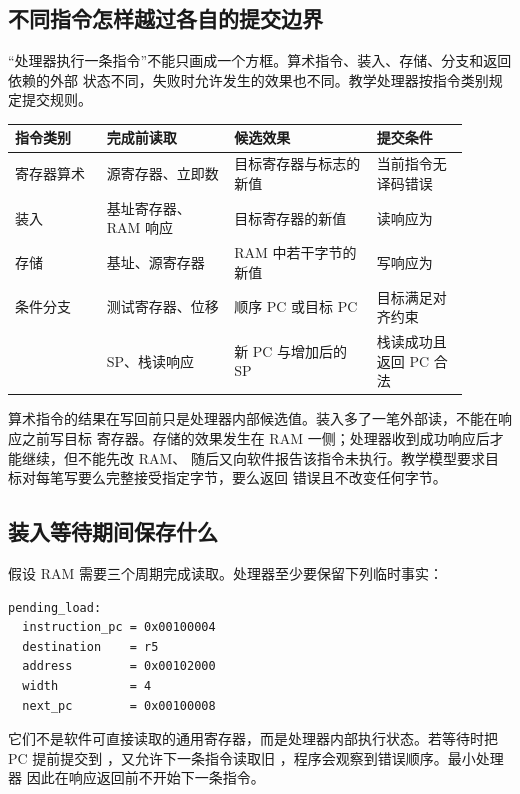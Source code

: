 \subsection{不同指令怎样越过各自的提交边界}

“处理器执行一条指令”不能只画成一个方框。算术指令、装入、存储、分支和返回依赖的外部
状态不同，失败时允许发生的效果也不同。教学处理器按指令类别规定提交规则。

\begin{longtable}{|L{0.18\linewidth}|L{0.25\linewidth}|L{0.29\linewidth}|L{0.18\linewidth}|}
\hline
{}
指令类别 & 完成前读取 & 候选效果 & 提交条件 \\ \hline
寄存器算术 & 源寄存器、立即数 & 目标寄存器与标志的新值 & 当前指令无译码错误 \\ \hline
装入 & 基址寄存器、RAM 响应 & 目标寄存器的新值 & 读响应为  \\ \hline
存储 & 基址、源寄存器 & RAM 中若干字节的新值 & 写响应为  \\ \hline
条件分支 & 测试寄存器、位移 & 顺序 PC 或目标 PC & 目标满足对齐约束 \\ \hline
{} & SP、栈读响应 & 新 PC 与增加后的 SP & 栈读成功且返回 PC 合法 \\ \hline
\end{longtable}

算术指令的结果在写回前只是处理器内部候选值。装入多了一笔外部读，不能在响应之前写目标
寄存器。存储的效果发生在 RAM 一侧；处理器收到成功响应后才能继续，但不能先改 RAM、
随后又向软件报告该指令未执行。教学模型要求目标对每笔写要么完整接受指定字节，要么返回
错误且不改变任何字节。

\subsection{装入等待期间保存什么}

假设 RAM 需要三个周期完成读取。处理器至少要保留下列临时事实：

\begin{lstlisting}
pending_load:
  instruction_pc = 0x00100004
  destination    = r5
  address        = 0x00102000
  width          = 4
  next_pc        = 0x00100008
\end{lstlisting}

它们不是软件可直接读取的通用寄存器，而是处理器内部执行状态。若等待时把 PC 提前提交到
，又允许下一条指令读取旧 ，程序会观察到错误顺序。最小处理器
因此在响应返回前不开始下一条指令。


